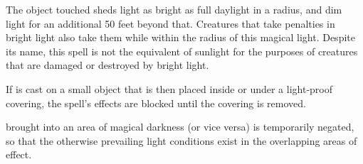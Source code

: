 \begin{spellheader}
\end{spellheader}
\begin{spellcontent}
    \begin{spelltargetinginfo}
    \end{spelltargetinginfo}
    \begin{spelleffects}
        \spelldur{\durmed}
    \end{spelleffects}
\end{spellcontent}
\begin{spellfooter}
\end{spellfooter}


\begin{spellheader}
\end{spellheader}
\begin{spellcontent}
    \begin{spelltargetinginfo}
    \end{spelltargetinginfo}
    \begin{spelleffects}
        \spelleffect The object touched sheds light as bright as full daylight in a \arealarge radius, and dim light for an additional 50 feet beyond that. Creatures that take penalties in bright light also take them while within the radius of this magical light. Despite its name, this spell is not the equivalent of sunlight for the purposes of creatures that are damaged or destroyed by bright light.
        \par If  is cast on a small object that is then placed inside or under a light-proof covering, the spell's effects are blocked until the covering is removed.
        \spelldur{\durlong \dismissable}
    \end{spelleffects}
\end{spellcontent}
\begin{spellfooter}
    \spellnotes {} brought into an area of magical darkness (or vice versa) is temporarily negated, so that the otherwise prevailing light conditions exist in the overlapping areas of effect.
\end{spellfooter}

